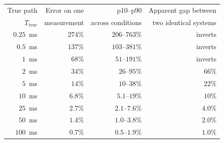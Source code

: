 \begin{tabular}{@{}rrrr@{}}
\toprule
True path & Error on one & p10--p90 & Apparent gap between \\
$T_{\mathrm{true}}$ & measurement & across conditions & two identical systems \\
\midrule
$0.25$~ms & $274$\% & $206$--$763$\% & inverts \\
$0.5$~ms & $137$\% & $103$--$381$\% & inverts \\
$1$~ms & $68$\% & $51$--$191$\% & inverts \\
$2$~ms & $34$\% & $26$--$95$\% & $66$\% \\
$5$~ms & $14$\% & $10$--$38$\% & $22$\% \\
$10$~ms & $6.8$\% & $5.1$--$19$\% & $10$\% \\
$25$~ms & $2.7$\% & $2.1$--$7.6$\% & $4.0$\% \\
$50$~ms & $1.4$\% & $1.0$--$3.8$\% & $2.0$\% \\
$100$~ms & $0.7$\% & $0.5$--$1.9$\% & $1.0$\% \\
\bottomrule
\end{tabular}
